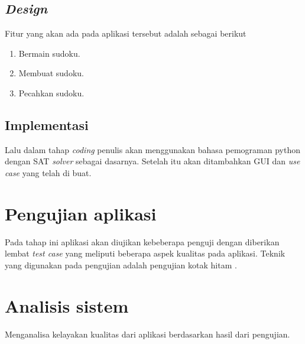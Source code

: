 \subsection{\textit{Design}}

Fitur yang akan ada pada aplikasi tersebut adalah sebagai berikut

 \begin{enumerate}
 	\item Bermain sudoku.
 	\item Membuat sudoku.
 	\item Pecahkan sudoku.
 \end{enumerate}

\subsection{Implementasi}

Lalu dalam tahap \textit{coding} penulis akan menggunakan
bahasa pemograman python dengan SAT \textit{solver} \cite{SATPy2} sebagai dasarnya. Setelah itu akan ditambahkan GUI dan \textit{use case} yang telah di buat.

\section{Pengujian aplikasi}

Pada tahap ini aplikasi akan diujikan kebeberapa penguji dengan diberikan lembat \textit{test case} yang meliputi beberapa aspek kualitas pada aplikasi. Teknik yang digunakan pada pengujian adalah pengujian kotak hitam \cite{TEST1}.

\section{Analisis sistem}

Menganalisa kelayakan kualitas dari aplikasi berdasarkan hasil dari pengujian.